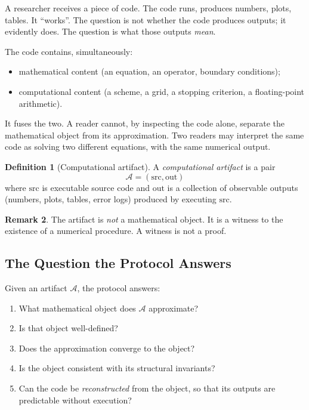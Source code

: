 \documentclass[11pt,a4paper]{article}
\theoremstyle{definition}
\newtheorem{definition}{Definition}[section]
\newtheorem{remark}[definition]{Remark}
\theoremstyle{plain}
\newcommand{\Acal}{\mathcal{A}}
\begin{document}
A researcher receives a piece of code. The code runs, produces
numbers, plots, tables. It ``works''. The question is not whether
the code produces outputs; it evidently does. The question is what
those outputs \emph{mean}.

The code contains, simultaneously:
\begin{itemize}
  \item mathematical content (an equation, an operator, boundary
        conditions);
  \item computational content (a scheme, a grid, a stopping
        criterion, a floating-point arithmetic).
\end{itemize}
It fuses the two. A reader cannot, by inspecting the code alone,
separate the mathematical object from its approximation. Two
readers may interpret the same code as solving two different
equations, with the same numerical output.

\begin{definition}[Computational artifact]\label{def:artifact}
A \emph{computational artifact} is a pair
\[
  \Acal = (\mathrm{src}, \mathrm{out})
\]
where $\mathrm{src}$ is executable source code and $\mathrm{out}$
is a collection of observable outputs (numbers, plots, tables,
error logs) produced by executing $\mathrm{src}$.
\end{definition}

\begin{remark}
The artifact is \emph{not} a mathematical object. It is a witness
to the existence of a numerical procedure. A witness is not a
proof.
\end{remark}

\subsection{The Question the Protocol Answers}

Given an artifact $\Acal$, the protocol answers:
\begin{enumerate}[label=(\roman*)]
  \item What mathematical object does $\Acal$ approximate?
  \item Is that object well-defined?
  \item Does the approximation converge to the object?
  \item Is the object consistent with its structural invariants?
  \item Can the code be \emph{reconstructed} from the object, so
        that its outputs are predictable without execution?
\end{enumerate}
\end{document}
